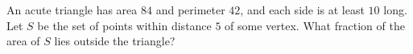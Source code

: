 An acute triangle has area $84$ and perimeter $42$, and each side is at least $10$ long. Let $S$ be the set of points within distance $5$ of some vertex. What fraction of the area of $S$ lies outside the triangle?
